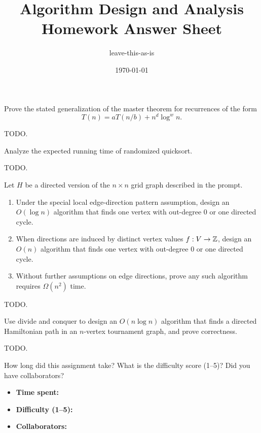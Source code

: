 \documentclass{article}
\begin{document}
\title{Algorithm Design and Analysis Homework Answer Sheet}
\author{leave-this-as-is}
\date{\today}
\maketitle

  Prove the stated generalization of the master theorem for recurrences of the form
  \[
    T(n) = aT(n/b) + n^d \log^w n.
  \]
\begin{solution}
  TODO.
\end{solution}

  Analyze the expected running time of randomized quicksort.
\begin{solution}
  TODO.
\end{solution}

  Let $H$ be a directed version of the $n \times n$ grid graph described in the prompt.
  \begin{enumerate}[label=(\alph*)]
    \item Under the special local edge-direction pattern assumption, design an $O(\log n)$ algorithm that finds one vertex with out-degree $0$ or one directed cycle.
    \vspace*{2.0in}

    \item When directions are induced by distinct vertex values $f : V \to \mathbb{Z}$, design an $O(n)$ algorithm that finds one vertex with out-degree $0$ or one directed cycle.
    \vspace*{2.0in}

    \item Without further assumptions on edge directions, prove any such algorithm requires $\Omega(n^2)$ time.
    \vspace*{1.5in}
  \end{enumerate}
\begin{solution}
  TODO.
\end{solution}

  Use divide and conquer to design an $O(n \log n)$ algorithm that finds a directed Hamiltonian path in an $n$-vertex tournament graph, and prove correctness.
\begin{solution}
  TODO.
\end{solution}

  How long did this assignment take? What is the difficulty score (1--5)? Did you have collaborators?
\begin{solution}
  \begin{itemize}
    \item \textbf{Time spent:} \underline{\hspace{2.5in}}\\[1.2em]
    \item \textbf{Difficulty (1--5):} \underline{\hspace{1.5in}}\\[1.2em]
    \item \textbf{Collaborators:} \underline{\hspace{2.3in}}
  \end{itemize}
\end{solution}
\end{document}
